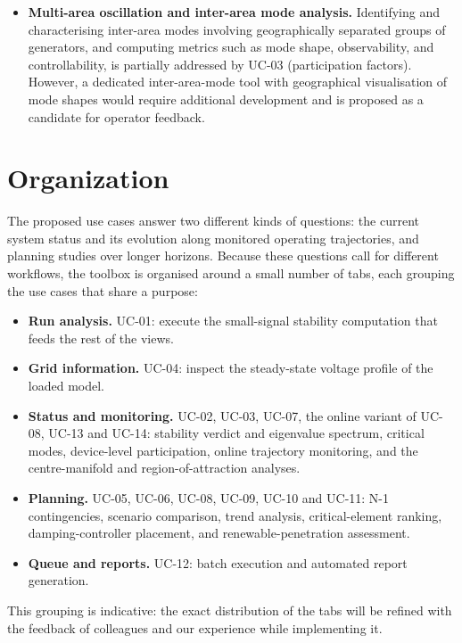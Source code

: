 \begin{itemize}
  \item \textbf{Multi-area oscillation and inter-area mode analysis.} Identifying and characterising inter-area modes involving geographically separated groups of generators, and computing metrics such as mode shape, observability, and controllability, is partially addressed by UC-03 (participation factors). However, a dedicated inter-area-mode tool with geographical visualisation of mode shapes would require additional development and is proposed as a candidate for operator feedback.
\end{itemize}

\section{Organization}

The proposed use cases answer two different kinds of questions: the current system status and its evolution along monitored operating trajectories, and planning studies over longer horizons. Because these questions call for different workflows, the toolbox is organised around a small number of tabs, each grouping the use cases that share a purpose:

\begin{itemize}
  \item \textbf{Run analysis.} UC-01: execute the small-signal stability computation that feeds the rest of the views.
  \item \textbf{Grid information.} UC-04: inspect the steady-state voltage profile of the loaded model.
  \item \textbf{Status and monitoring.} UC-02, UC-03, UC-07, the online variant of UC-08, UC-13 and UC-14: stability verdict and eigenvalue spectrum, critical modes, device-level participation, online trajectory monitoring, and the centre-manifold and region-of-attraction analyses.
  \item \textbf{Planning.} UC-05, UC-06, UC-08, UC-09, UC-10 and UC-11: N-1 contingencies, scenario comparison, trend analysis, critical-element ranking, damping-controller placement, and renewable-penetration assessment.
  \item \textbf{Queue and reports.} UC-12: batch execution and automated report generation.
\end{itemize}

This grouping is indicative: the exact distribution of the tabs will be refined with the feedback of colleagues and our experience while implementing it.
